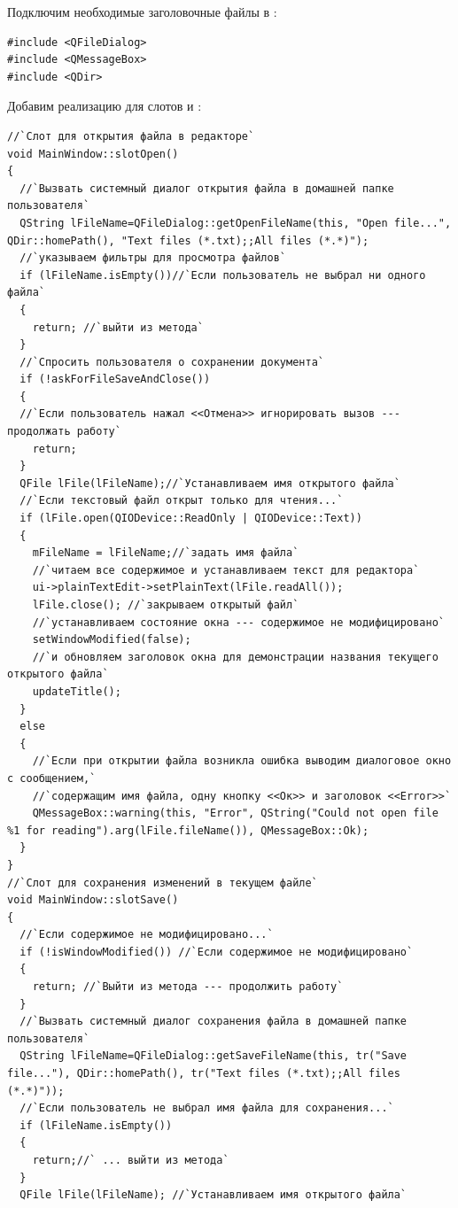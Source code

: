 Подключим необходимые заголовочные файлы в : 
\begin{lstlisting}
#include <QFileDialog>
#include <QMessageBox>
#include <QDir>
\end{lstlisting}

Добавим реализацию для слотов  и : 
\begin{lstlisting}
//`Слот для открытия файла в редакторе` 
void MainWindow::slotOpen()
{
  //`Вызвать системный диалог открытия файла в домашней папке пользователя` 
  QString lFileName=QFileDialog::getOpenFileName(this, "Open file...", QDir::homePath(), "Text files (*.txt);;All files (*.*)"); 
  //`указываем фильтры для просмотра файлов` 
  if (lFileName.isEmpty())//`Если пользователь не выбрал ни одного файла`
  {
    return; //`выйти из метода`
  }
  //`Спросить пользователя о сохранении документа`
  if (!askForFileSaveAndClose())
  {
  //`Если пользователь нажал <<Отмена>> игнорировать вызов --- продолжать работу`
    return;
  }
  QFile lFile(lFileName);//`Устанавливаем имя открытого файла`
  //`Если текстовый файл открыт только для чтения...` 
  if (lFile.open(QIODevice::ReadOnly | QIODevice::Text))
  {
    mFileName = lFileName;//`задать имя файла`
    //`читаем все содержимое и устанавливаем текст для редактора`
    ui->plainTextEdit->setPlainText(lFile.readAll());
    lFile.close(); //`закрываем открытый файл`
    //`устанавливаем состояние окна --- содержимое не модифицировано`
    setWindowModified(false);
    //`и обновляем заголовок окна для демонстрации названия текущего открытого файла` 
    updateTitle();
  }
  else
  {
    //`Если при открытии файла возникла ошибка выводим диалоговое окно с сообщением,` 
    //`содержащим имя файла, одну кнопку <<Ок>> и заголовок <<Error>>` 
    QMessageBox::warning(this, "Error", QString("Could not open file %1 for reading").arg(lFile.fileName()), QMessageBox::Ok);
  }
}
//`Слот для сохранения изменений в текущем файле` 
void MainWindow::slotSave()
{
  //`Если содержимое не модифицировано...`
  if (!isWindowModified()) //`Если содержимое не модифицировано`
  {
    return; //`Выйти из метода --- продолжить работу`
  }
  //`Вызвать системный диалог сохранения файла в домашней папке пользователя`
  QString lFileName=QFileDialog::getSaveFileName(this, tr("Save file..."), QDir::homePath(), tr("Text files (*.txt);;All files (*.*)"));
  //`Если пользователь не выбрал имя файла для сохранения...`
  if (lFileName.isEmpty())
  {
    return;//` ... выйти из метода`
  }
  QFile lFile(lFileName); //`Устанавливаем имя открытого файла` 

\end{lstlisting}

